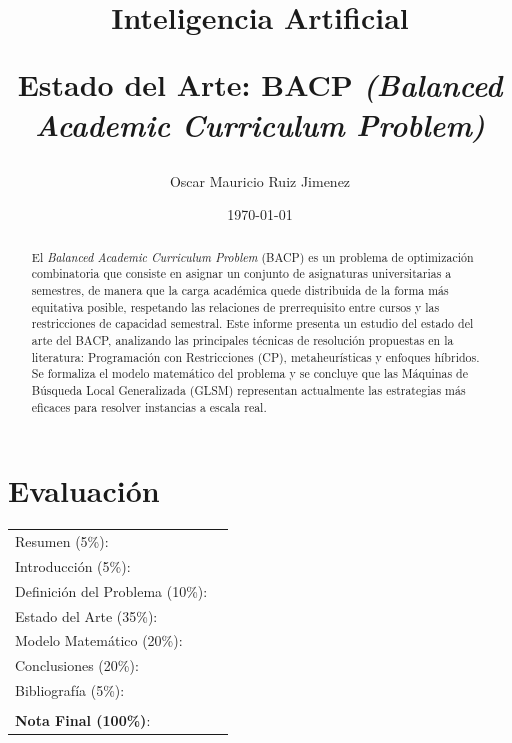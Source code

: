 \documentclass[letter, 10pt]{article}
\begin{document}
\title{Inteligencia Artificial \\ \begin{Large}Estado del Arte: BACP \textit{(Balanced Academic Curriculum Problem)}\end{Large}}
\author{Oscar Mauricio Ruiz Jimenez}
\date{\today}
\maketitle


\section*{Evaluaci\'on}

\begin{tabular}{ll}
Resumen (5\%): & \underline{\hspace{2cm}} \\
Introducci\'on (5\%):  & \underline{\hspace{2cm}} \\
Definici\'on del Problema (10\%):  & \underline{\hspace{2cm}} \\
Estado del Arte (35\%):  & \underline{\hspace{2cm}} \\
Modelo Matem\'atico (20\%): &  \underline{\hspace{2cm}}\\
Conclusiones (20\%): &  \underline{\hspace{2cm}}\\
Bibliograf\'ia (5\%): & \underline{\hspace{2cm}}\\
 &  \\
\textbf{Nota Final (100\%)}:   & \underline{\hspace{2cm}}
\end{tabular}
\vspace{2cm}


\begin{abstract}
El \textit{Balanced Academic Curriculum Problem} (BACP) es un problema de optimizaci\'on combinatoria que consiste en asignar un conjunto de asignaturas universitarias a semestres, de manera que la carga acad\'emica quede distribuida de la forma m\'as equitativa posible, respetando las relaciones de prerrequisito entre cursos y las restricciones de capacidad semestral. Este informe presenta un estudio del estado del arte del BACP, analizando las principales t\'ecnicas de resoluci\'on propuestas en la literatura: Programaci\'on con Restricciones (CP), metaheur\'isticas y enfoques h\'ibridos. Se formaliza el modelo matem\'atico del problema y se concluye que las M\'aquinas de B\'usqueda Local Generalizada (GLSM) representan actualmente las estrategias m\'as eficaces para resolver instancias a escala real. 
\end{abstract}
\end{document}
